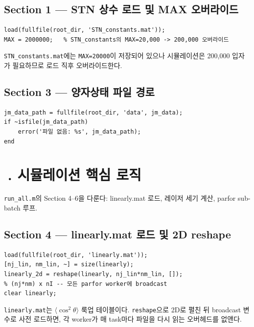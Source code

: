 \documentclass[11pt, a4paper]{article}
\newcommand{\emo}[1]{{\emojifont #1}}
\begin{document}
\subsection{Section 1 — STN 상수 로드 및 MAX 오버라이드}

\begin{lstlisting}
load(fullfile(root_dir, 'STN_constants.mat'));
MAX = 2000000;   % STN_constants의 MAX=20,000 -> 200,000 오버라이드
\end{lstlisting}

\begin{tip}[💡]
\texttt{STN\_constants.mat}에는 \texttt{MAX=20000}이 저장되어 있으나
시뮬레이션은 200,000 입자가 필요하므로 로드 직후 오버라이드한다.
\end{tip}

\subsection{Section 3 — 양자상태 파일 경로}

\begin{lstlisting}
jm_data_path = fullfile(root_dir, 'data', jm_data);
if ~isfile(jm_data_path)
    error('파일 없음: %s', jm_data_path);
end
\end{lstlisting}

\section{\emo{🔬}. 시뮬레이션 핵심 로직}

\begin{callout}[📌]
\texttt{run\_all.m}의 Section 4--6을 다룬다:
linearly.mat 로드, 레이저 세기 계산, parfor sub-batch 루프.
\end{callout}

\subsection{Section 4 — linearly.mat 로드 및 2D reshape}

\begin{lstlisting}
load(fullfile(root_dir, 'linearly.mat'));
[nj_lin, nm_lin, ~] = size(linearly);
linearly_2d = reshape(linearly, nj_lin*nm_lin, []);
% (nj*nm) x nI -- 모든 parfor worker에 broadcast
clear linearly;
\end{lstlisting}

\begin{tip}[💡]
\texttt{linearly.mat}는 $\langle\cos^2\theta\rangle$ 룩업 테이블이다.
\texttt{reshape}으로 2D로 펼친 뒤 broadcast 변수로 사전 로드하면,
각 worker가 매 task마다 파일을 다시 읽는 오버헤드를 없앤다.
\end{tip}
\end{document}
